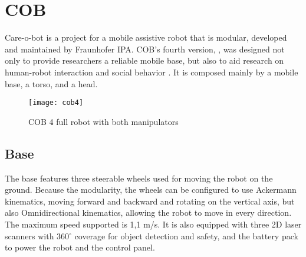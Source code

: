 

\section{COB}

Care-o-bot is a project for a mobile assistive robot that is modular, developed and maintained by Fraunhofer IPA. COB's fourth version, , was designed not only to provide researchers a reliable mobile base, but also to aid research on human-robot interaction and social behavior \cite{mci/Kittmann2015}. It is composed mainly by a mobile base, a torso, and a head.

\begin{figure}[!ht]
\centering
\texttt{[image: cob4]}
\caption{COB 4 full robot with both manipulators \cite{care-o-bot-image-full}}
\label{fig:cob4}
\end{figure}

\subsection{Base}

The base features three steerable wheels used for moving the robot on the ground. Because the modularity, the wheels can be configured to use Ackermann kinematics, moving forward and backward and rotating on the vertical axis, but also Omnidirectional kinematics, allowing the robot to move in every direction. The maximum speed supported is 1,1 m/s. It is also equipped with three 2D laser scanners with 360$^{\circ}$ coverage for object detection and safety, and the battery pack to power the robot and the control panel.

